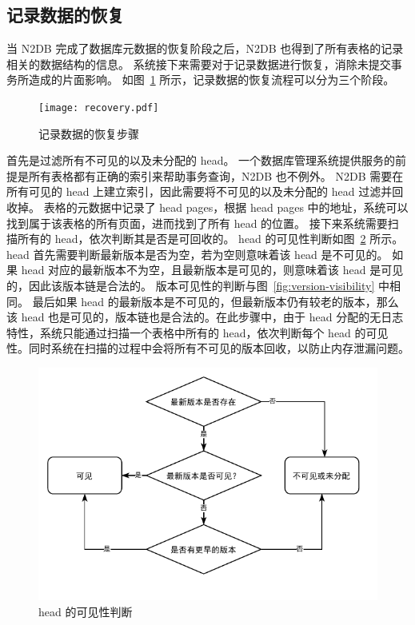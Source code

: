 \subsection{记录数据的恢复}
\label{ssec:record-recovery}

当 N2DB 完成了数据库元数据的恢复阶段之后，N2DB 也得到了所有表格的记录相关的数据结构的信息。
系统接下来需要对于记录数据进行恢复，消除未提交事务所造成的片面影响。
如图~\ref{fig:record-recovery} 所示，记录数据的恢复流程可以分为三个阶段。

\begin{figure}[ht]
    \centering
    \texttt{[image: recovery.pdf]}
    \caption{记录数据的恢复步骤}
    \label{fig:record-recovery}
\end{figure}

首先是过滤所有不可见的以及未分配的 head。
一个数据库管理系统提供服务的前提是所有表格都有正确的索引来帮助事务查询，N2DB 也不例外。
N2DB 需要在所有可见的 head 上建立索引，因此需要将不可见的以及未分配的 head 过滤并回收掉。
表格的元数据中记录了 head pages，根据 head pages 中的地址，系统可以找到属于该表格的所有页面，进而找到了所有 head 的位置。
接下来系统需要扫描所有的 head，依次判断其是否是可回收的。
head 的可见性判断如图~\ref{fig:head-visibility} 所示。
head 首先需要判断最新版本是否为空，若为空则意味着该 head 是不可见的。
如果 head 对应的最新版本不为空，且最新版本是可见的，则意味着该 head 是可见的，因此该版本链是合法的。
版本可见性的判断与图~\ref{fig:version-visibility} 中相同。
最后如果 head 的最新版本是不可见的，但最新版本仍有较老的版本，那么该 head 也是可见的，版本链也是合法的。在此步骤中，由于 head 分配的无日志特性，系统只能通过扫描一个表格中所有的 head，依次判断每个 head 的可见性。同时系统在扫描的过程中会将所有不可见的版本回收，以防止内存泄漏问题。

\begin{figure}[ht]
    \centering
    \includegraphics[width=1\linewidth]{figures/head_visibility.pdf}
    \caption{head 的可见性判断}
    \label{fig:head-visibility}
\end{figure}

